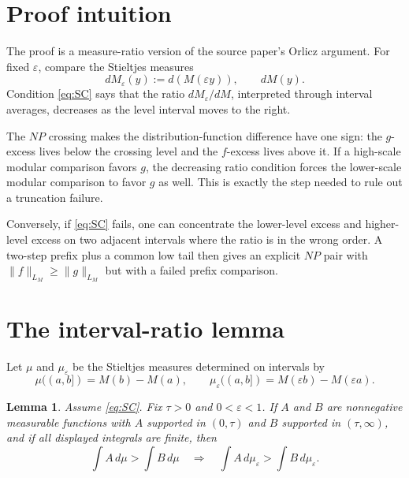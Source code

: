 \documentclass[11pt]{article}
\newtheorem{lemma}{Lemma}
\newcommand{\eps}{\varepsilon}
\begin{document}
\section*{Proof intuition}

The proof is a measure-ratio version of the source paper's Orlicz argument.
For fixed $\eps$, compare the Stieltjes measures
\[
 dM_\eps(y):=d(M(\eps y)),\qquad dM(y).
\]
Condition \eqref{eq:SC} says that the ratio $dM_\eps/dM$, interpreted through
interval averages, decreases as the level interval moves to the right.

The $NP$ crossing makes the distribution-function difference have one sign:
the $g$-excess lives below the crossing level and the $f$-excess lives above
it. If a high-scale modular comparison favors $g$, the decreasing ratio
condition forces the lower-scale modular comparison to favor $g$ as well.
This is exactly the step needed to rule out a truncation failure.

Conversely, if \eqref{eq:SC} fails, one can concentrate the lower-level
excess and higher-level excess on two adjacent intervals where the ratio is in
the wrong order. A two-step prefix plus a common low tail then gives an
explicit $NP$ pair with $\|f\|_{L_M}\ge\|g\|_{L_M}$ but with a failed prefix
comparison.

\section*{The interval-ratio lemma}

Let $\mu$ and $\mu_\eps$ be the Stieltjes measures determined on intervals by
\[
 \mu((a,b])=M(b)-M(a),\qquad
 \mu_\eps((a,b])=M(\eps b)-M(\eps a).
\]

\begin{lemma}
\label{lem:averaging}
Assume \eqref{eq:SC}. Fix $\tau>0$ and $0<\eps<1$. If $A$ and $B$ are
nonnegative measurable functions with $A$ supported in $(0,\tau)$ and $B$
supported in $(\tau,\infty)$, and if all displayed integrals are finite, then
\[
 \int A\,d\mu>\int B\,d\mu
 \quad\Longrightarrow\quad
 \int A\,d\mu_\eps>\int B\,d\mu_\eps .
\]
\end{lemma}
\end{document}
